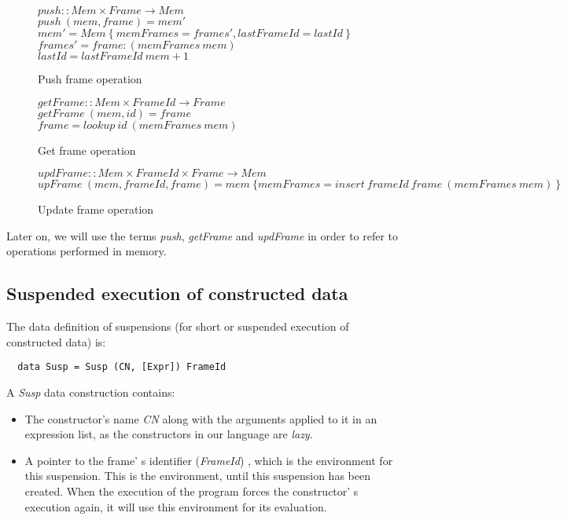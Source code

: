 \documentclass[diploma]{softlab-thesis}
\begin{document}
\begin{figure}[h]
  $ \mathit{push} :: \mathit{Mem \times Frame \rightarrow Mem} $ \\
  $ \mathit{push~(mem, frame) = mem'} $ \\
  $ \mathit{mem' = Mem~\{~memFrames = frames', lastFrameId = lastId~\} } $ \\
  $ \mathit{frames' = frame : (memFrames~mem)} $ \\
  $ \mathit{lastId = lastFrameId~mem + 1} $
\caption{Push frame operation\label{fig:push}}
\end{figure}

\begin{figure}[h]
  $ \mathit{getFrame} :: \mathit{Mem \times FrameId \rightarrow Frame} $ \\
  $ \mathit{getFrame~(mem, id) = frame} $ \\
  $ \mathit{frame = lookup~id~(memFrames~mem)} $
\caption{Get frame operation\label{fig:getFrame}}
\end{figure}

\begin{figure}[h]
  $ \mathit{updFrame} :: \mathit{Mem \times FrameId \times Frame \rightarrow Mem} $ \\
  $ \mathit{upFrame~(mem, frameId, frame) = 
      mem~\{memFrames = insert~frameId~frame~(memFrames~mem)~\} } $ 
\caption{Update frame operation\label{fig:updFrame}}
\end{figure}


Later on, we will use the terms \textit{push}, \textit{getFrame} and \textit{updFrame} in order to refer to 
operations performed in memory.

\subsection{Suspended execution of constructed data}
\label{sec:suspended}

The data definition of suspensions (for short or suspended execution of constructed data) is:
\begin{verbatim}
  data Susp = Susp (CN, [Expr]) FrameId
\end{verbatim}

A \textit{Susp} data construction contains:
\begin{itemize}
  \item The constructor's name \textit{CN} along with the arguments applied to it in an expression list, 
  as the constructors in our language are \textit{lazy}.
  \item A pointer to the frame' s identifier (\textit{FrameId}) , which is the environment for this suspension.
  This is the environment, until this suspension has been created. When the execution of the program forces the 
  constructor' s execution again, it will use this environment for its evaluation.
\end{itemize}
\end{document}
